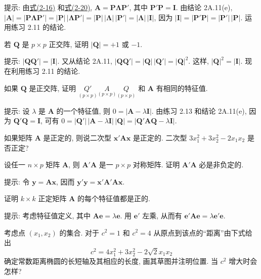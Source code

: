 \noindent 提示: 由\hyperref[eq:2-16]{式(2-16)} 和\hyperref[eq:2-20]{式(2-20)}, $\mathbf{A}=\mathbf{P}\boldsymbol{\Lambda}\mathbf{P}'$, 其中 $\mathbf{P}'\mathbf{P}=\mathbf{I}$. 由结论 2A.11(e), $|\mathbf{A}|=|\mathbf{P}\boldsymbol{\Lambda}\mathbf{P}'|=|\mathbf{P}|\,|\boldsymbol{\Lambda}\mathbf{P}'|=|\mathbf{P}|\,|\boldsymbol{\Lambda}|\,|\mathbf{P}'|=|\boldsymbol{\Lambda}|\,|\mathbf{I}|$, 因为 $|\mathbf{I}|=|\mathbf{P}'\mathbf{P}|=|\mathbf{P}'|\,|\mathbf{P}|$. 运用练习 2.11 的结论.

\medskip
{}\quad 若 $\mathbf{Q}$ 是 $p\times p$ 正交阵, 证明 $|\mathbf{Q}|=+1$ 或 $-1$.

\noindent 提示: $|\mathbf{Q}\mathbf{Q}'|=|\mathbf{I}|$. 又从结论 2A.11, $|\mathbf{Q}\mathbf{Q}'|=|\mathbf{Q}|\,|\mathbf{Q}'|=|\mathbf{Q}|^{2}$. 这样, $|\mathbf{Q}|^{2}=|\mathbf{I}|$. 现在利用练习 2.11 的结论.

\medskip
{}\quad 如果 $\mathbf{Q}$ 是正交阵, 证明 $\underset{(p\times p)}{Q'}\underset{(p\times p)}{A}\underset{(p\times p)}{Q}$ 和 $\mathbf{A}$ 有相同的特征值.

\noindent 提示: 设 $\lambda$ 是 $\mathbf{A}$ 的一个特征值, 则 $0=|\mathbf{A}-\lambda\mathbf{I}|$. 由练习 2.13 和结论 2A.11(e), 因为 $\mathbf{Q}'\mathbf{Q}=\mathbf{I}$, 可有 $0=|\mathbf{Q}'|\,|\mathbf{A}-\lambda\mathbf{I}|\,|\mathbf{Q}|=|\mathbf{Q}'\mathbf{A}\mathbf{Q}-\lambda\mathbf{I}|$.

\medskip
{}\quad 如果矩阵 $\mathbf{A}$ 是正定的, 则说二次型 $\mathbf{x}'\mathbf{A}\mathbf{x}$ 是正定的. 二次型 $3x_{1}^{2}+3x_{2}^{2}-2x_{1}x_{2}$ 是否正定?

\medskip
{}\quad 设任一 $n\times p$ 矩阵 $\mathbf{A}$, 则 $\mathbf{A}'\mathbf{A}$ 是一 $p\times p$ 对称矩阵. 证明 $\mathbf{A}'\mathbf{A}$ 必是非负定的.

\noindent 提示: 令 $\mathbf{y}=\mathbf{A}\mathbf{x}$, 因而 $\mathbf{y}'\mathbf{y}=\mathbf{x}'\mathbf{A}'\mathbf{A}\mathbf{x}$.

\medskip
{}\quad 证明 $k\times k$ 正定矩阵 $\mathbf{A}$ 的每个特征值都是正的.

\noindent 提示: 考虑特征值定义, 其中 $\mathbf{A}\mathbf{e}=\lambda\mathbf{e}$. 用 $\mathbf{e}'$ 左乘, 从而有 $\mathbf{e}'\mathbf{A}\mathbf{e}=\lambda\mathbf{e}'\mathbf{e}$.

\medskip
{}\quad 考虑点 $(x_{1},x_{2})$ 的集合. 对于 $c^{2}=1$ 和 $c^{2}=4$ 从原点到该点的“距离”由下式给出
\[
c^{2}=4x_{1}^{2}+3x_{2}^{2}-2\sqrt{2}x_{1}x_{2}
\]
确定常数距离椭圆的长短轴及其相应的长度, 画其草图并注明位置. 当 $c^{2}$ 增大时会怎样?

